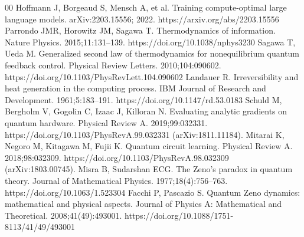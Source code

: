 \documentclass[journal]{IEEEtran}
\begin{document}
\begin{thebibliography}{00}
 Hoffmann J, Borgeaud S, Mensch A, et al. Training compute-optimal large language models. arXiv:2203.15556; 2022. https://arxiv.org/abs/2203.15556
 Parrondo JMR, Horowitz JM, Sagawa T. Thermodynamics of information. Nature Physics. 2015;11:131--139. https://doi.org/10.1038/nphys3230
 Sagawa T, Ueda M. Generalized second law of thermodynamics for nonequilibrium quantum feedback control. Physical Review Letters. 2010;104:090602. https://doi.org/10.1103/PhysRevLett.104.090602
 Landauer R. Irreversibility and heat generation in the computing process. IBM Journal of Research and Development. 1961;5:183--191. https://doi.org/10.1147/rd.53.0183
 Schuld M, Bergholm V, Gogolin C, Izaac J, Killoran N. Evaluating analytic gradients on quantum hardware. Physical Review A. 2019;99:032331. https://doi.org/10.1103/PhysRevA.99.032331 (arXiv:1811.11184).
 Mitarai K, Negoro M, Kitagawa M, Fujii K. Quantum circuit learning. Physical Review A. 2018;98:032309. https://doi.org/10.1103/PhysRevA.98.032309 (arXiv:1803.00745).
 Misra B, Sudarshan ECG. The Zeno’s paradox in quantum theory. Journal of Mathematical Physics. 1977;18(4):756--763. https://doi.org/10.1063/1.523304
 Facchi P, Pascazio S. Quantum Zeno dynamics: mathematical and physical aspects. Journal of Physics A: Mathematical and Theoretical. 2008;41(49):493001. https://doi.org/10.1088/1751-8113/41/49/493001
\end{thebibliography}
\end{document}
